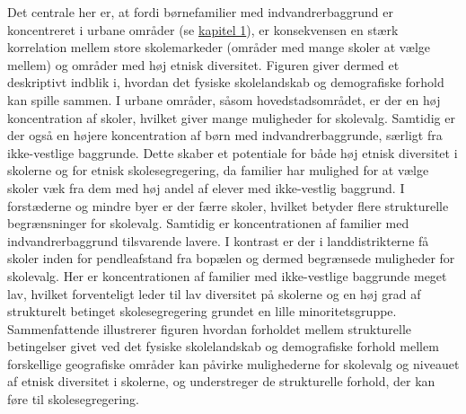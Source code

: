 \documentclass[
]{book}
\begin{document}
Det centrale her er, at fordi børnefamilier med indvandrerbaggrund er koncentreret i urbane områder (se \hyperref[kap1]{kapitel 1}), er konsekvensen en stærk korrelation mellem store skolemarkeder (områder med mange skoler at vælge mellem) og områder med høj etnisk diversitet. Figuren giver dermed et deskriptivt indblik i, hvordan det fysiske skolelandskab og demografiske forhold kan spille sammen. I urbane områder, såsom hovedstadsområdet, er der en høj koncentration af skoler, hvilket giver mange muligheder for skolevalg. Samtidig er der også en højere koncentration af børn med indvandrerbaggrunde, særligt fra ikke-vestlige baggrunde. Dette skaber et potentiale for både høj etnisk diversitet i skolerne og for etnisk skolesegregering, da familier har mulighed for at vælge skoler væk fra dem med høj andel af elever med ikke-vestlig baggrund. I forstæderne og mindre byer er der færre skoler, hvilket betyder flere strukturelle begrænsninger for skolevalg. Samtidig er koncentrationen af familier med indvandrerbaggrund tilsvarende lavere. I kontrast er der i landdistrikterne få skoler inden for pendleafstand fra bopælen og dermed begrænsede muligheder for skolevalg. Her er koncentrationen af familier med ikke-vestlige baggrunde meget lav, hvilket forventeligt leder til lav diversitet på skolerne og en høj grad af strukturelt betinget skolesegregering grundet en lille minoritetsgruppe. Sammenfattende illustrerer figuren hvordan forholdet mellem strukturelle betingelser givet ved det fysiske skolelandskab og demografiske forhold mellem forskellige geografiske områder kan påvirke mulighederne for skolevalg og niveauet af etnisk diversitet i skolerne, og understreger de strukturelle forhold, der kan føre til skolesegregering.
\end{document}
